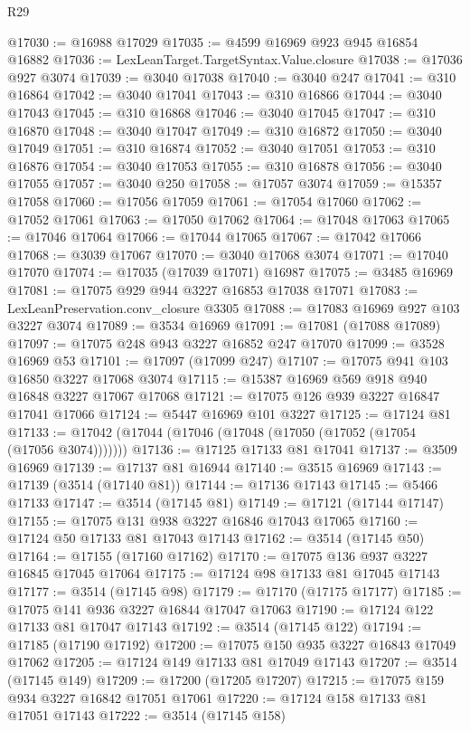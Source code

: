 \begin{lexlean}{R29}
\begin{coremodule}
@17030 := @16988 @17029
@17035 := @4599 @16969 @923 @945 @16854 @16882
@17036 := LexLeanTarget.TargetSyntax.Value.closure
@17038 := @17036 @927 @3074
@17039 := @3040 @17038
@17040 := @3040 @247
@17041 := @310 @16864
@17042 := @3040 @17041
@17043 := @310 @16866
@17044 := @3040 @17043
@17045 := @310 @16868
@17046 := @3040 @17045
@17047 := @310 @16870
@17048 := @3040 @17047
@17049 := @310 @16872
@17050 := @3040 @17049
@17051 := @310 @16874
@17052 := @3040 @17051
@17053 := @310 @16876
@17054 := @3040 @17053
@17055 := @310 @16878
@17056 := @3040 @17055
@17057 := @3040 @250
@17058 := @17057 @3074
@17059 := @15357 @17058
@17060 := @17056 @17059
@17061 := @17054 @17060
@17062 := @17052 @17061
@17063 := @17050 @17062
@17064 := @17048 @17063
@17065 := @17046 @17064
@17066 := @17044 @17065
@17067 := @17042 @17066
@17068 := @3039 @17067
@17070 := @3040 @17068 @3074
@17071 := @17040 @17070
@17074 := @17035 (@17039 @17071) @16987
@17075 := @3485 @16969
@17081 := @17075 @929 @944 @3227 @16853 @17038 @17071
@17083 := LexLeanPreservation.conv_closure @3305
@17088 := @17083 @16969 @927 @103 @3227 @3074
@17089 := @3534 @16969
@17091 := @17081 (@17088 @17089)
@17097 := @17075 @248 @943 @3227 @16852 @247 @17070
@17099 := @3528 @16969 @53
@17101 := @17097 (@17099 @247)
@17107 := @17075 @941 @103 @16850 @3227 @17068 @3074
@17115 := @15387 @16969 @569 @918 @940 @16848 @3227 @17067 @17068
@17121 := @17075 @126 @939 @3227 @16847 @17041 @17066
@17124 := @5447 @16969 @101 @3227
@17125 := @17124 @81
@17133 := @17042 (@17044 (@17046 (@17048 (@17050 (@17052 (@17054 (@17056 @3074)))))))
@17136 := @17125 @17133 @81 @17041
@17137 := @3509 @16969
@17139 := @17137 @81 @16944
@17140 := @3515 @16969
@17143 := @17139 (@3514 (@17140 @81))
@17144 := @17136 @17143
@17145 := @5466 @17133
@17147 := @3514 (@17145 @81)
@17149 := @17121 (@17144 @17147)
@17155 := @17075 @131 @938 @3227 @16846 @17043 @17065
@17160 := @17124 @50 @17133 @81 @17043 @17143
@17162 := @3514 (@17145 @50)
@17164 := @17155 (@17160 @17162)
@17170 := @17075 @136 @937 @3227 @16845 @17045 @17064
@17175 := @17124 @98 @17133 @81 @17045 @17143
@17177 := @3514 (@17145 @98)
@17179 := @17170 (@17175 @17177)
@17185 := @17075 @141 @936 @3227 @16844 @17047 @17063
@17190 := @17124 @122 @17133 @81 @17047 @17143
@17192 := @3514 (@17145 @122)
@17194 := @17185 (@17190 @17192)
@17200 := @17075 @150 @935 @3227 @16843 @17049 @17062
@17205 := @17124 @149 @17133 @81 @17049 @17143
@17207 := @3514 (@17145 @149)
@17209 := @17200 (@17205 @17207)
@17215 := @17075 @159 @934 @3227 @16842 @17051 @17061
@17220 := @17124 @158 @17133 @81 @17051 @17143
@17222 := @3514 (@17145 @158)

\end{coremodule}
\end{lexlean}
